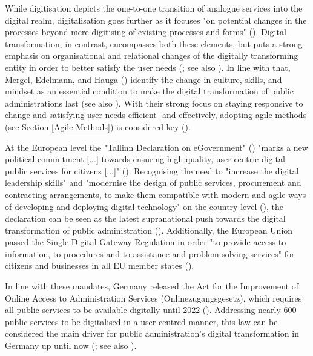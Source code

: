 While digitisation depicts the one-to-one transition of analogue services into the digital realm, digitalisation goes further as it focuses "on potential changes in the processes beyond mere digitising of existing processes and forms" (\cite[p. 12]{Mergel2019a}). Digital transformation, in contrast, encompasses both these elements, but puts a strong emphasis on organisational and relational changes of the digitally transforming entity in order to better satisfy the user needs (\cite{Mergel2019a}; see also \cite{Vial2019, Henriette2015}). In line with that, Mergel, Edelmann, and Hauga (\cite*{Mergel2019a}) identify the change in culture, skills, and mindset as an essential condition to make the digital transformation of public administrations last (see also \cite{Dierks2020, Parcell2013}). With their strong focus on staying responsive to change and satisfying user needs efficient- and effectively, adopting agile methods (see Section \ref{Agile Methods}) is considered key (\cite{Mergel2018,Beyer2010, Mergel2019, osmundsen2020, Andriole2018}).\par 
At the European level the "Tallinn Declaration on eGovernment" (\cite*{EuropeanCommission2017}) "marks a new political commitment [...] towards ensuring high quality, user-centric digital public services for citizens [...]" (\cite{EuropeanCommission2017a}). Recognising the need to "increase the digital leadership skills" and "modernise the design of public services, procurement and contracting arrangements, to make them compatible with modern and agile ways of developing and deploying digital technology" on the country-level (\cite[p. 7]{EuropeanCommission2017}), the declaration can be seen as the latest supranational push towards the digital transformation of public administration (\cite{Mergel2019a}). Additionally, the European Union passed the Single Digital Gateway Regulation in order "to provide access to information, to procedures and to assistance and problem-solving services" for citizens and businesses in all EU member states (\cite{EuropeanUnion2018}).\par 
In line with these mandates, Germany released the Act for the Improvement of Online Access to Administration Services (Onlinezugangsgesetz), which requires all public services to be available digitally until 2022 (\cite{DeutscherBundestag2017}). Addressing nearly 600 public services to be digitalised in a user-centred manner, this law can be considered the main driver for public administration's digital transformation in Germany up until now (\cite{Mergel2019, BundesministeriumdesInnerenfurBauundHeimat2017}; see also \cite{EuropeanCommission2019a}).\par 
